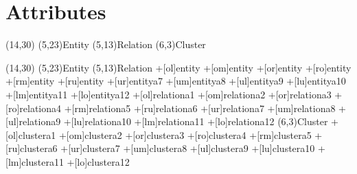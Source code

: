 \documentclass[a4paper,11pt]{article}
\begin{document}
\section{Attributes}

\begin{schema}(14,30)
  \entity[entity](5,23){Entity}
  \relation[relation](5,13){Relation}
  \cluster[cluster](6,3){Cluster}
\end{schema}

\begin{schema}(14,30)
  \entity[entity](5,23){Entity}
  \relation[relation](5,13){Relation}
  \attr+[ol]{entity}{}
  \attr+[om]{entity}{}
  \attr+[or]{entity}{}
  \attr+[ro]{entity}{}
  \attr+[rm]{entity}{}
  \attr+[ru]{entity}{}
  \attr+[ur]{entity}{a7}
  \attr+[um]{entity}{a8}
  \attr+[ul]{entity}{a9}
  \attr+[lu]{entity}{a10}
  \attr+[lm]{entity}{a11}
  \attr+[lo]{entity}{a12}
  \attr+[ol]{relation}{a1}
  \attr+[om]{relation}{a2}
  \attr+[or]{relation}{a3}
  \attr+[ro]{relation}{a4}
  \attr+[rm]{relation}{a5}
  \attr+[ru]{relation}{a6}
  \attr+[ur]{relation}{a7}
  \attr+[um]{relation}{a8}
  \attr+[ul]{relation}{a9}
  \attr+[lu]{relation}{a10}
  \attr+[lm]{relation}{a11}
  \attr+[lo]{relation}{a12}
  \cluster[cluster](6,3){Cluster}
  \attr+[ol]{cluster}{a1}
  \attr+[om]{cluster}{a2}
  \attr+[or]{cluster}{a3}
  \attr+[ro]{cluster}{a4}
  \attr+[rm]{cluster}{a5}
  \attr+[ru]{cluster}{a6}
  \attr+[ur]{cluster}{a7}
  \attr+[um]{cluster}{a8}
  \attr+[ul]{cluster}{a9}
  \attr+[lu]{cluster}{a10}
  \attr+[lm]{cluster}{a11}
  \attr+[lo]{cluster}{a12}
\end{schema}
\end{document}
